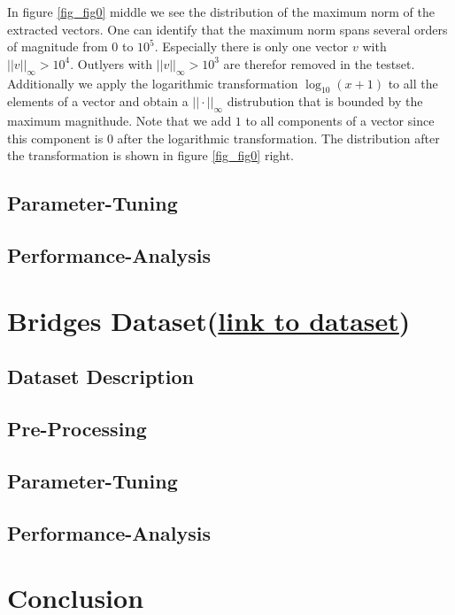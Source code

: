 \documentclass[11pt]{article}
\begin{document}
In figure \ref{fig_fig0} middle we see the distribution of the maximum norm of the extracted vectors. One can identify that the maximum norm spans several orders of magnitude from $0$ to $10^5$. Especially there is only one vector $v$ with $||v||_\infty>10^4$. Outlyers with $||v||_\infty>10^3$ are therefor removed in the testset. Additionally we apply the logarithmic transformation $\log_{10}(x+1)$ to all the elements of a vector and obtain a $||\cdot||_\infty$ distrubution that is bounded by the maximum magnithude. Note that we add $1$ to all components of a vector since this component is $0$ after the logarithmic transformation. The distribution after the transformation is shown in figure \ref{fig_fig0} right.




\subsection{Parameter-Tuning}
\subsection{Performance-Analysis}


\section{Bridges Dataset(\href{https://archive.ics.uci.edu/ml/datasets/Pittsburgh+Bridges}{link to dataset})}
\subsection{Dataset Description}
\subsection{Pre-Processing}
\subsection{Parameter-Tuning}
\subsection{Performance-Analysis}

\section{Conclusion}

\newpage


\end{document}
